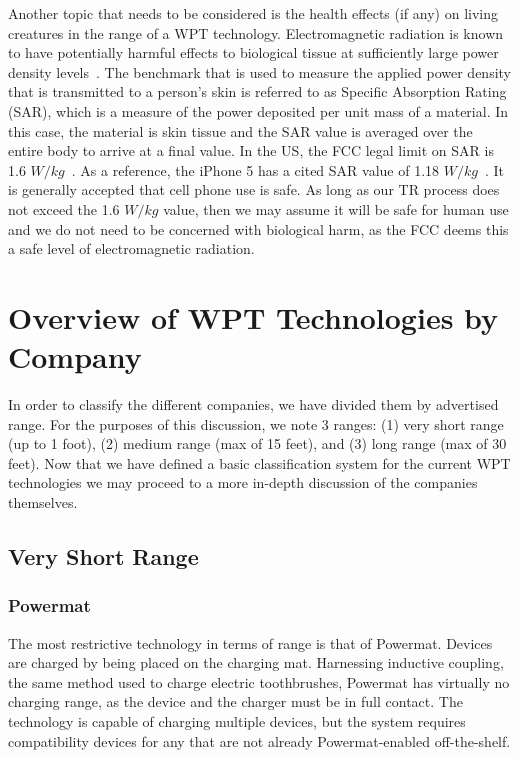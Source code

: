 Another topic that needs to be considered is the health effects (if any) on living creatures in the range of a WPT technology. Electromagnetic radiation is known to have potentially harmful effects to biological tissue at sufficiently large power density levels~\cite{adey1993biological}. The benchmark that is used to measure the applied power density that is transmitted to a person's skin is referred to as Specific Absorption Rating (SAR), which is a measure of the power deposited per unit mass of a material. In this case, the material is skin tissue and the SAR value is averaged over the entire body to arrive at a final value. In the US, the FCC legal limit on SAR is 1.6 $W/kg$~\cite{procon2015}. As a reference, the iPhone 5 has a cited SAR value of 1.18 $W/kg$~\cite{procon2015}. It is generally accepted that cell phone use is safe. As long as our TR process does not exceed the 1.6 $W/kg$ value, then we may assume it will be safe for human use and we do not need to be concerned with biological harm, as the FCC deems this a safe level of electromagnetic radiation.

\section{Overview of WPT Technologies by Company}
\label{sec:lit-review-tech}
In order to classify the different companies, we have divided them by advertised range. For the purposes of this discussion, we note 3 ranges: (1) very short range (up to 1 foot), (2) medium range (max of 15 feet), and (3) long range (max of 30 feet). Now that we have defined a basic classification system for the current WPT technologies we may proceed to a more in-depth discussion of the companies themselves.

\subsection{Very Short Range}
\subsubsection{Powermat}
The most restrictive technology in terms of range is that of Powermat. Devices are charged by being placed on the charging mat. Harnessing inductive coupling, the same method used to charge electric toothbrushes, Powermat has virtually no charging range, as the device and the charger must be in full contact. The technology is capable of charging multiple devices, but the system requires compatibility devices for any that are not already Powermat-enabled off-the-shelf.

